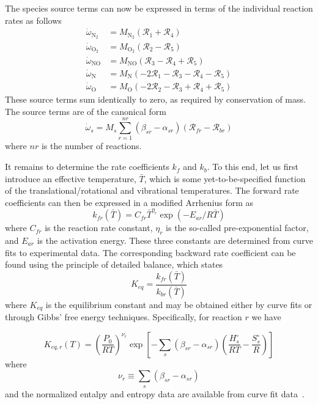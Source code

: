 The species source terms can now be expressed in terms of the individual reaction rates as follows
\begin{align*}
  \dot{\omega}_{\text{N}_2} &= M_{\text{N}_2}\left(\mathcal{R}_1 + \mathcal{R}_4\right) \\
  \dot{\omega}_{\text{O}_2} &= M_{\text{O}_2}\left(\mathcal{R}_2 - \mathcal{R}_5\right) \\
  \dot{\omega}_{\text{NO}} &= M_{\text{NO}}\left(\mathcal{R}_3 -\mathcal{R}_4 + \mathcal{R}_5\right) \\
  \dot{\omega}_{\text{N}}  &= M_{\text{N}}\left(-2\mathcal{R}_1 -\mathcal{R}_3 - \mathcal{R}_4 - \mathcal{R}_5\right) \\
  \dot{\omega}_{\text{O}}  &= M_{\text{O}}\left(-2\mathcal{R}_2 -\mathcal{R}_3 + \mathcal{R}_4 + \mathcal{R}_5\right)
\end{align*}
These source terms sum identically to zero, as required by conservation of mass. The source terms are of the canonical form
\begin{equation}
  \dot{\omega}_s = M_s \sum_{r=1}^{nr}\left(\beta_{sr}-\alpha_{sr}\right)\left(\mathcal{R}_{fr} - \mathcal{R}_{br}\right)
\end{equation}
where $nr$ is the number of reactions. 

It remains to determine the rate coefficients $k_{f}$ and $k_{b}$.  To this end, let us first introduce an effective temperature, $\bar{T}$, which is some yet-to-be-specified function of the translational/rotational and vibrational temperatures.  The forward rate coefficients can then be expressed in a modified Arrhenius form as
\begin{equation}
  k_{fr}\left(\bar{T}\right) = C_{fr} \bar{T}^{\eta_r} \exp \left(-E_{ar}/R\bar{T}\right)
\end{equation}
where $C_{fr}$ is the reaction rate constant, $\eta_r$ is the so-called pre-exponential factor, and $E_{ar}$ is the activation energy.  These three constants are determined from curve fits to experimental data.  The corresponding backward rate coefficient can be found using the principle of detailed balance, which states
\begin{equation}
  K_{eq} = \frac{k_{fr}\left(\bar{T}\right)}{k_{br}\left(\bar{T}\right)}
\end{equation}
where $K_{eq}$ is the equilibrium constant and may be obtained either by curve fits or through Gibbs' free energy techniques. Specifically, for reaction $r$ we have

\begin{equation}
  K_{eq,r}\left(T\right) = \left(\frac{P_0}{RT}\right)^{\nu_r}\exp\left[-\sum_s\left(\beta_{sr}-\alpha_{sr}\right)\left(\frac{H^\circ_s}{RT} - \frac{S^\circ_s}{R}\right)\right]
\end{equation}
where
\begin{equation}
  \nu_r \equiv \sum_s\left(\beta_{sr}-\alpha_{sr}\right)
\end{equation}
and the normalized entalpy and entropy data are available from curve fit data~\cite{barnhardt_thesis}.

